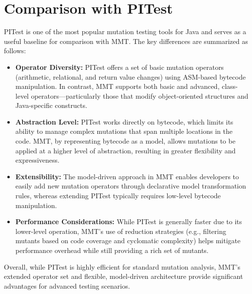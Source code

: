 \documentclass[sigplan, nonacm]{acmart}
\begin{document}
\section{Comparison with PITest}
\label{sec:comparison}
PITest is one of the most popular mutation testing tools for Java and serves as a useful baseline for comparison with MMT. The key differences are summarized as follows:
\begin{itemize}[noitemsep]
    \item \textbf{Operator Diversity:} PITest offers a set of basic mutation operators (arithmetic, relational, and return value changes) using ASM-based bytecode manipulation. In contrast, MMT supports both basic and advanced, class-level operators—particularly those that modify object-oriented structures and Java-specific constructs.
    \item \textbf{Abstraction Level:} PITest works directly on bytecode, which limits its ability to manage complex mutations that span multiple locations in the code. MMT, by representing bytecode as a model, allows mutations to be applied at a higher level of abstraction, resulting in greater flexibility and expressiveness.
    \item \textbf{Extensibility:} The model-driven approach in MMT enables developers to easily add new mutation operators through declarative model transformation rules, whereas extending PITest typically requires low-level bytecode manipulation.
    \item \textbf{Performance Considerations:} While PITest is generally faster due to its lower-level operation, MMT’s use of reduction strategies (e.g., filtering mutants based on code coverage and cyclomatic complexity) helps mitigate performance overhead while still providing a rich set of mutants.
\end{itemize}
Overall, while PITest is highly efficient for standard mutation analysis, MMT’s extended operator set and flexible, model-driven architecture provide significant advantages for advanced testing scenarios.
\end{document}
